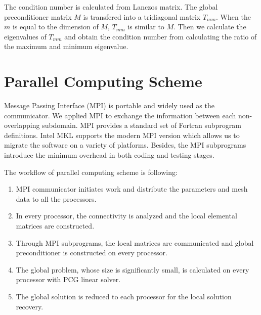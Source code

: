 The condition number is calculated from Lanczos matrix. The global preconditioner matrix $ M $ is transfered into a tridiagonal matrix $ T_{mm} $. When the $ m $ is equal to the dimension of $ M $, $ T_{mm} $ is similar to $ M $. Then we calculate the eigenvalues of $ T_{mm} $ and obtain the condition number from calculating the ratio of  the maximum and minimum eigenvalue.


\section{Parallel Computing Scheme}

Message Passing Interface (MPI) \cite{gropp1996high} is portable and widely used as the communicator. We applied MPI to exchange the information between each non-overlapping subdomain. MPI provides a standard set of Fortran subprogram definitions. Intel MKL supports the modern MPI version which allows us to migrate the software on a variety of platforms. Besides, the MPI subprograms introduce the minimum overhead in both coding and testing stages.

The workflow of parallel computing scheme is following:
\begin{enumerate}
	\item	MPI communicator initiates work and distribute the parameters and mesh data to all the processors.
	\item	In every processor, the connectivity is analyzed and the local elemental matrices are constructed.
	\item	Through MPI subprograms, the local matrices are communicated and global preconditioner is constructed on every processor.
	\item	The global problem, whose size is significantly small, is calculated on every processor with PCG linear solver.
	\item	The global solution is reduced to each processor for the local solution recovery. 
\end{enumerate}

